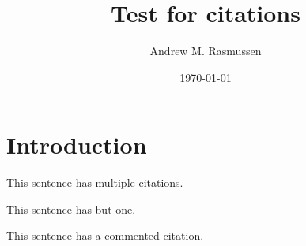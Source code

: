 \documentclass[aip,jcp,amsmath,amssymb,reprint,floatfix]{revtex4-1}
\begin{document}
\title{Test for citations}
\author{Andrew M. Rasmussen}
\date{\today}

\maketitle

\section{Introduction}\label{introduction}

This sentence has multiple citations.\cite{Skolnick2004,Wood2010}

This sentence has but one.\cite{Kos2005}

This sentence has a commented citation.%


\end{document}
